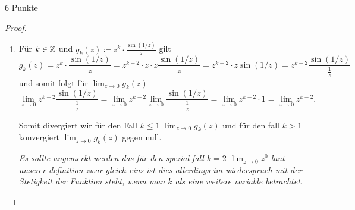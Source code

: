 \documentclass{problemset}
\begin{document}
\begin{problem}[Grenzwerte]{6 Punkte}
\begin{proof}
\begin{enumerate}
        \item Für $k \in \mathbb{Z}$ und $g_k(z) \coloneqq z^k \cdot
              \frac{\sin(1/z)}{z}$ gilt \[
                  g_k(z) = z^k \cdot \frac{\sin(1/z)}{z} = z^{k - 2} \cdot z \cdot z \frac{\sin(1/z)}{z} = z^{k - 2} \cdot z \sin(1/z) = z^{k - 2} \frac{\sin(1/z)}{\frac{1}{z}}
              \] und somit folgt für $\lim_{ z \to 0} g_k(z)$ \[
                  \lim_{z \to 0} z^{k - 2} \frac{\sin(1/z)}{\frac{1}{z}} = \lim_{z \to 0} z^{k - 2} \lim_{z \to 0} \frac{\sin(1/z)}{\frac{1}{z}} = \lim_{z \to 0} z^{k - 2} \cdot 1 = \lim_{z \to 0} z^{k - 2}.
              \]

              Somit divergiert wir für den Fall $k \le 1$ $\lim_{z \to 0}
              g_k(z)$ und für den fall $k > 1$ konvergiert $\lim_{z \to 0}
              g_k(z)$ gegen null.

              \textit{Es sollte angemerkt werden das für den spezial fall $k = 2$ $\lim_{z \to 0} z^0$ laut unserer definition zwar gleich eins ist dies allerdings im wiederspruch mit der Stetigkeit der Funktion steht,
                  wenn man $k$ als eine weitere variable betrachtet.}

    \end{enumerate}
\end{proof}
\end{problem}
\end{document}
